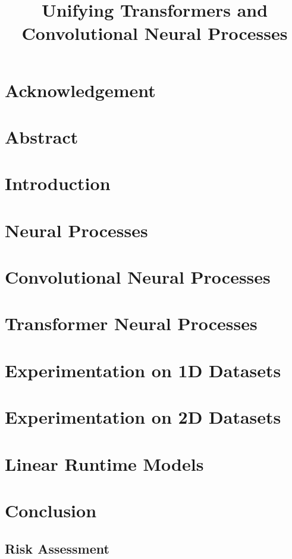\documentclass[12pt]{report}
\newcommand{\lrtitle}{
	Unifying Transformers and Convolutional Neural Processes
}
\begin{document}
\title{\textbf{\fontsize{24.88}{12}\selectfont \lrtitle}}
\author{{\LARGE \name}}

\reporttitlepage

\chapter*{Acknowledgement}

\newpage
\chapter*{Abstract}




\chapter{Introduction}


\chapter{Neural Processes}


\chapter{Convolutional Neural Processes}


\chapter{Transformer Neural Processes}



\chapter{Experimentation on 1D Datasets}


\chapter{Experimentation on 2D Datasets}


\chapter{Linear Runtime Models}


\chapter{Conclusion}



\printbibliography[heading=bibintoc]{}



\newpage
 

\begin{appendices}
\chapter{Risk Assessment}


\end{appendices}
\end{document}
